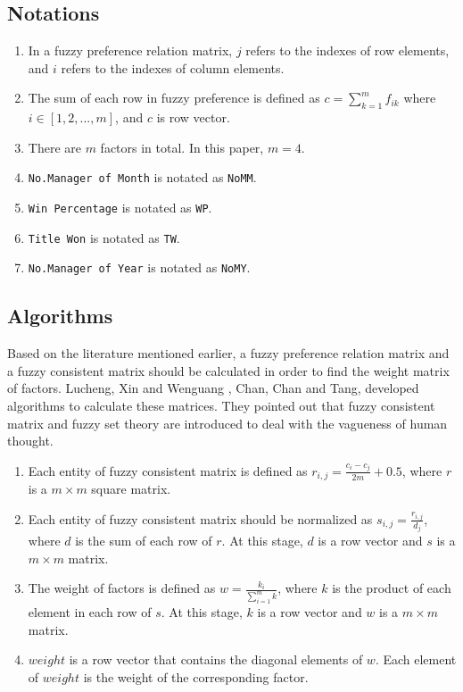 \documentclass[12pt,a4paper]{article}
\begin{document}
\subsection{Notations}

    \begin{enumerate}
        \item In a fuzzy preference relation matrix, $j$ refers to the indexes of row elements, and $i$ refers to the indexes of column elements.
        \item The sum of each row in fuzzy preference is defined as $c = \sum_{k=1}^{m}f_{ik}$ where $i\in [1, 2, ..., m]$, and $c$ is row vector.
        \item There are $m$ factors in total. In this paper, $m=4$.
        \item \texttt{No.Manager of Month} is notated as \texttt{NoMM}.
        \item \texttt{Win Percentage} is notated as \texttt{WP}.
        \item \texttt{Title Won} is notated as \texttt{TW}.
        \item \texttt{No.Manager of Year} is notated as \texttt{NoMY}.
    \end{enumerate}
    
\subsection{Algorithms}

    Based on the literature mentioned earlier, a fuzzy preference relation matrix and a fuzzy consistent matrix should be calculated in order to find the weight matrix of factors. Lucheng, Xin and Wenguang \citeyear{lucheng2010research}, Chan, Chan and Tang, \citeyear{chan2000evaluation} developed algorithms to calculate these matrices. They pointed out that fuzzy consistent matrix and fuzzy set theory are introduced to deal with the vagueness of human thought.

    \begin{enumerate}
        \item Each entity of fuzzy consistent matrix is defined as $r_{i, j} = \frac{c_{i}-c_{j}}{2m}+0.5$, where $r$ is a $m\times m$ square matrix.
        \item Each entity of fuzzy consistent matrix should be normalized as $s_{i,j} = \frac{r_{i,j}}{d_{j}}$, where $d$ is the sum of each row of $r$. At this stage, $d$ is a row vector and $s$ is a $m\times m$ matrix.
        \item The weight of factors is defined as $w = \frac{k_{i}}{\sum_{i=1}^{m} k}$, where $k$ is the product of each element in each row of $s$. At this stage, $k$ is a row vector and $w$ is a $m\times m$ matrix.
        \item $weight$ is a row vector that contains the diagonal elements of $w$. Each element of $weight$ is the weight of the corresponding factor.
    \end{enumerate}
	
\end{document}
